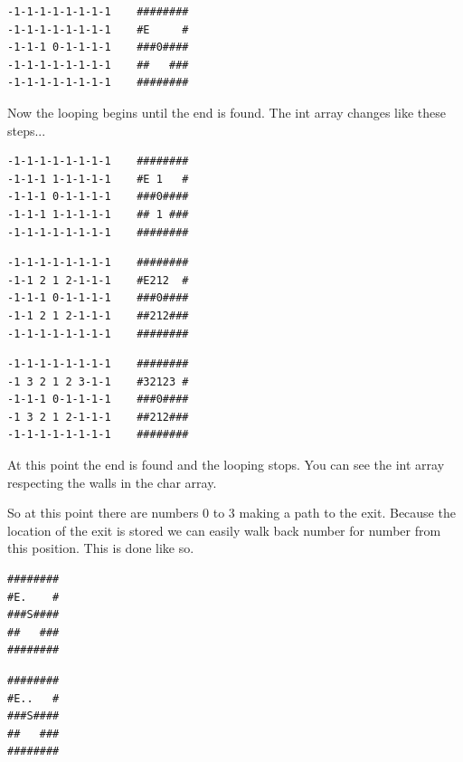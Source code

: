 \documentclass[pdftex,12pt,a4paper]{article}
\begin{document}
\begin{verbatim}
-1-1-1-1-1-1-1-1    ########
-1-1-1-1-1-1-1-1    #E     #
-1-1-1 0-1-1-1-1    ###0####
-1-1-1-1-1-1-1-1    ##   ###
-1-1-1-1-1-1-1-1    ########
\end{verbatim}
Now the looping begins until the end is found. The int array changes like these steps...

\begin{verbatim}
-1-1-1-1-1-1-1-1    ########
-1-1-1 1-1-1-1-1    #E 1   #
-1-1-1 0-1-1-1-1    ###0####
-1-1-1 1-1-1-1-1    ## 1 ###
-1-1-1-1-1-1-1-1    ########
\end{verbatim}

\begin{verbatim}
-1-1-1-1-1-1-1-1    ########
-1-1 2 1 2-1-1-1    #E212  #
-1-1-1 0-1-1-1-1    ###0####
-1-1 2 1 2-1-1-1    ##212###
-1-1-1-1-1-1-1-1    ########
\end{verbatim}

\begin{verbatim}
-1-1-1-1-1-1-1-1    ########
-1 3 2 1 2 3-1-1    #32123 #
-1-1-1 0-1-1-1-1    ###0####
-1 3 2 1 2-1-1-1    ##212###
-1-1-1-1-1-1-1-1    ########
\end{verbatim}
At this point the end is found and the looping stops.
You can see the int array respecting the walls in the char array.

So at this point there are numbers 0 to 3 making a path to the exit. Because the location of the exit is stored we can easily walk back number for number from this position.
This is done like so.

\begin{verbatim}
########
#E.    #
###S####
##   ###
########
\end{verbatim}

\begin{verbatim}
########
#E..   #
###S####
##   ###
########
\end{verbatim}
\end{document}
